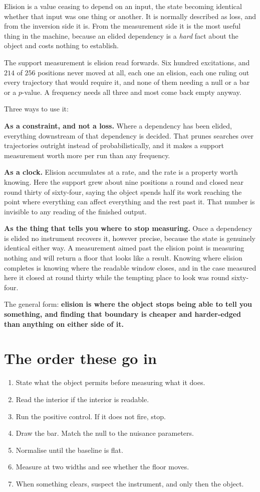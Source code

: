 Elision is a value ceasing to depend on an input, the state becoming identical whether that input was one thing or another. It is normally described as loss, and from the inversion side it is. From the measurement side it is the most useful thing in the machine, because an elided dependency is a \emph{hard} fact about the object and costs nothing to establish.

The support measurement is elision read forwards. Six hundred excitations, and \(214\) of \(256\) positions never moved at all, each one an elision, each one ruling out every trajectory that would require it, and none of them needing a null or a bar or a \(p\)-value. A frequency needs all three and most come back empty anyway.

Three ways to use it:

\textbf{As a constraint, and not a loss.} Where a dependency has been elided, everything downstream of that dependency is decided. That prunes searches over trajectories outright instead of probabilistically, and it makes a support measurement worth more per run than any frequency.

\textbf{As a clock.} Elision accumulates at a rate, and the rate is a property worth knowing. Here the support grew about nine positions a round and closed near round thirty of sixty-four, saying the object spends half its work reaching the point where everything can affect everything and the rest past it. That number is invisible to any reading of the finished output.

\textbf{As the thing that tells you where to stop measuring.} Once a dependency is elided no instrument recovers it, however precise, because the state is genuinely identical either way. A measurement aimed past the elision point is measuring nothing and will return a floor that looks like a result. Knowing where elision completes is knowing where the readable window closes, and in the case measured here it closed at round thirty while the tempting place to look was round sixty-four.

The general form: \textbf{elision is where the object stops being able to tell you something, and finding that boundary is cheaper and harder-edged than anything on either side of it.}

\section{The order these go in}

\begin{enumerate}
  \item State what the object permits before measuring what it does.
  \item Read the interior if the interior is readable.
  \item Run the positive control. If it does not fire, stop.
  \item Draw the bar. Match the null to the nuisance parameters.
  \item Normalise until the baseline is flat.
  \item Measure at two widths and see whether the floor moves.
  \item When something clears, suspect the instrument, and only then the object.
\end{enumerate}
